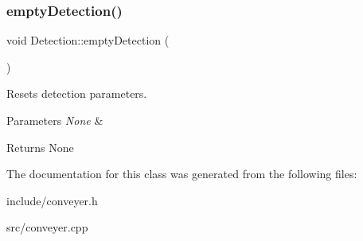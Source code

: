 \subsubsection{\texorpdfstring{empty\+Detection()}{emptyDetection()}}
{\footnotesize\ttfamily void Detection\+::empty\+Detection (\begin{DoxyParamCaption}{ }\end{DoxyParamCaption})}



Resets detection parameters. 


\begin{DoxyParams}{Parameters}
{\em None} & \\
\hline
\end{DoxyParams}
\begin{DoxyReturn}{Returns}
None 
\end{DoxyReturn}


The documentation for this class was generated from the following files\+:\begin{DoxyCompactItemize}
\item 
include/conveyer.\+h\item 
src/conveyer.\+cpp\end{DoxyCompactItemize}
